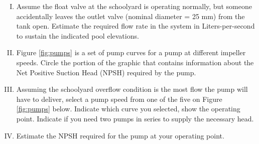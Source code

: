\documentclass[11pt]{article}
\begin{document}
\begin{enumerate}
\begin{enumerate}[(I)]
~\\~\\~\\~\\~\\~\\~\\~\\~\\~\\~\\~\\~\\~\\~\\~\\~\\~\\~\\~\\~\\~\\~\\~\\
\item Assume the float valve at the schoolyard is operating normally, but someone accidentally leaves the outlet valve (nominal diameter = 25 mm) from the tank open.  Estimate the required flow rate in the system in Liters-per-second to sustain the indicated pool elevations.
\clearpage
\item Figure \ref{fig:pumps} is a set of pump curves for a pump at different impeller speeds.  Circle the portion of the graphic that contains information about the Net Positive Suction Head (NPSH) required by the pump.
\item Assuming the schoolyard overflow condition is the most flow the pump will have to deliver, select a pump speed from one of the five on Figure \ref{fig:pumps} below.  Indicate which curve you selected, show the operating point.  Indicate if you need two pumps in series to supply the necessary head.
\item Estimate the NPSH required for the pump at your operating point.


\end{enumerate}
\end{enumerate}
\end{document}
